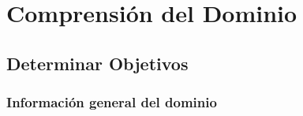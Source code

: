 \documentclass[11pt,a4paper]{tesis}
\begin{document}

\def\autor{Ing. Sebastian Ezequiel Jaremczuk}
\def\tituloTesis{Análisis de la Deserción en\\
	\vspace{.2cm} Carreras de Ingeniería}

\def\runtitulo{Deserción en Carreras de Ingeniería: Análisis de posibles causas}

\def\director{Mg. Ing. Juan Carlos Gómez}
\def\codirector{Dr. Marcelo Soria}
\def\lugar{Buenos Aires, 2020}


\frontmatter
\pagestyle{empty}



\cleardoublepage


\cleardoublepage



\cleardoublepage
\tableofcontents

\mainmatter
\pagestyle{headings}


%
%
%


\chapter{Comprensión del Dominio}
\section{Determinar Objetivos}
\subsection{Información general del dominio}

\end{document}
